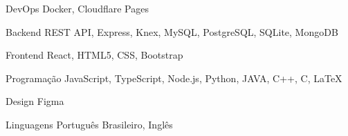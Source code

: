 

\begin{cvskills}

  \cvskill
    {DevOps} %
    {Docker, Cloudflare Pages} %

  \cvskill
    {Backend} %
    {REST API, Express, Knex, MySQL, PostgreSQL, SQLite, MongoDB} %

  \cvskill
    {Frontend} %
    {React, HTML5, CSS, Bootstrap} %

  \cvskill
    {Programação} %
    {JavaScript, TypeScript, Node.js, Python, JAVA, C++, C, LaTeX} %

  \cvskill
    {Design} %
    {Figma} %

  \cvskill
    {Linguagens} %
    {Português Brasileiro, Inglês} %

\end{cvskills}
